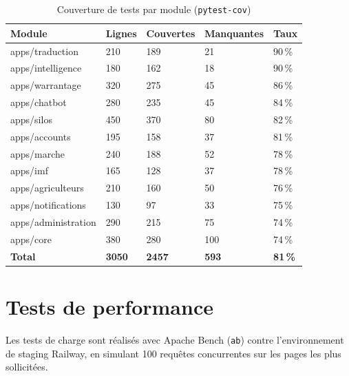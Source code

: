 \documentclass[12pt,a4paper,twoside]{report}
\begin{document}
\begin{table}[H]
\centering
\caption{Couverture de tests par module (\texttt{pytest-cov})}
\label{tab:couverture}
\begin{tabular}{L{4cm}C{2cm}C{2cm}C{2cm}C{2cm}}
\toprule
\textbf{Module} & \textbf{Lignes} & \textbf{Couvertes} & \textbf{Manquantes} & \textbf{Taux} \\
\midrule
apps/traduction  & 210 & 189 &  21 & 90\,\% \\
apps/intelligence & 180 & 162 &  18 & 90\,\% \\
apps/warrantage  & 320 & 275 &  45 & 86\,\% \\
apps/chatbot     & 280 & 235 &  45 & 84\,\% \\
apps/silos       & 450 & 370 &  80 & 82\,\% \\
apps/accounts    & 195 & 158 &  37 & 81\,\% \\
apps/marche      & 240 & 188 &  52 & 78\,\% \\
apps/imf         & 165 & 128 &  37 & 78\,\% \\
apps/agriculteurs & 210 & 160 &  50 & 76\,\% \\
apps/notifications & 130 & 97 &  33 & 75\,\% \\
apps/administration & 290 & 215 & 75 & 74\,\% \\
apps/core        & 380 & 280 & 100 & 74\,\% \\
\midrule
\textbf{Total}   & \textbf{3050} & \textbf{2457} & \textbf{593} & \textbf{81\,\%} \\
\bottomrule
\end{tabular}
\end{table}

\section{Tests de performance}

Les tests de charge sont réalisés avec Apache Bench (\texttt{ab}) contre
l'environnement de staging Railway, en simulant 100 requêtes concurrentes
sur les pages les plus sollicitées.
\end{document}

